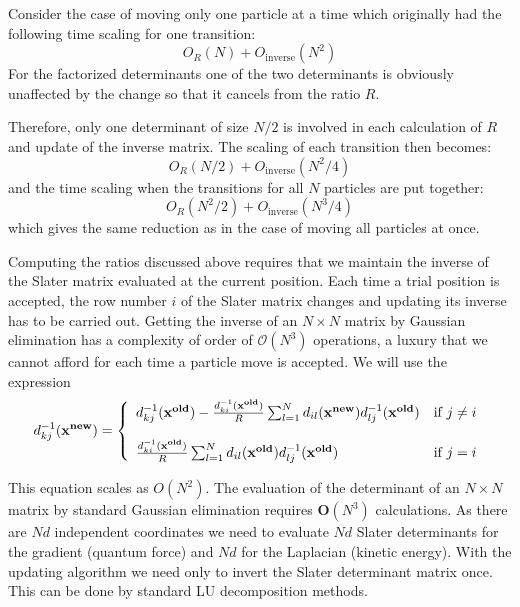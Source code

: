 \documentclass[%
oneside,                 %
final,                   %
10pt]{article}
\begin{document}
Consider the case of moving only one particle  at a time which
originally had the following time scaling for one transition:
\[
O_R(N)+O_\mathrm{inverse}(N^2)
\]
For the factorized determinants one of the two determinants is
obviously unaffected by the change so that it cancels from the ratio
$R$. 

Therefore, only one determinant of size $N/2$ is involved in each
calculation of $R$ and update of the inverse matrix. The scaling of
each transition then becomes:
\[
O_R(N/2)+O_\mathrm{inverse}(N^2/4)
\]
and the time scaling when the transitions for all $N$ particles are
put together:
\[
O_R(N^2/2)+O_\mathrm{inverse}(N^3/4)
\]
which gives the same reduction as in the case of moving all particles
at once.

Computing the ratios discussed above requires that we maintain 
the inverse of the Slater matrix evaluated at the current position. 
Each time a trial position is accepted, the row number $i$ of the Slater 
matrix changes and updating its inverse has to be carried out. 
Getting the inverse of an $N \times N$ matrix by Gaussian elimination has a 
complexity of order of $\mathcal{O}(N^3)$ operations, a luxury that we 
cannot afford for each time a particle  move is accepted.
We will use the expression
\begin{equation}
\label{updatingInverse}
d^{-1}_{kj}(\mathbf{x^{new}}) = \left\{\begin{array}{l l}
  d^{-1}_{kj}(\mathbf{x^{old}}) - \frac{d^{-1}_{ki}(\mathbf{x^{old}})}{R} \sum_{l=1}^{N} d_{il}(\mathbf{x^{new}})  d^{-1}_{lj}(\mathbf{x^{old}}) & \mbox{if $j \neq i$}\nonumber \\ \\
 \frac{d^{-1}_{ki}(\mathbf{x^{old}})}{R} \sum_{l=1}^{N} d_{il}(\mathbf{x^{old}}) d^{-1}_{lj}(\mathbf{x^{old}}) & \mbox{if $j=i$}
\end{array} \right.
\end{equation}

This equation scales as $O(N^2)$.
The evaluation of the determinant of an $N \times N$ matrix by standard Gaussian elimination 
requires $\mathbf{O}(N^3)$
calculations. 
As there are $Nd$ independent coordinates we need to evaluate $Nd$ Slater determinants 
for the gradient (quantum force) and $Nd$ for the Laplacian (kinetic energy). 
With the updating algorithm we need only to invert the Slater 
determinant matrix once. This can be done by standard LU decomposition methods.
\end{document}
